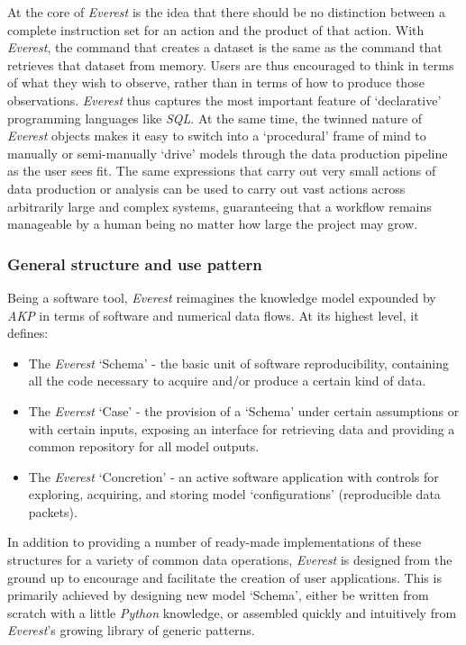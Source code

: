 \documentclass[a4paper,11pt,oneside]{book}
\begin{document}
At the core of \textit{Everest} is the idea that there should be no distinction between a complete instruction set for an action and the product of that action. With \textit{Everest}, the command that creates a dataset is the same as the command that retrieves that dataset from memory. Users are thus encouraged to think in terms of what they wish to observe, rather than in terms of how to produce those observations. \textit{Everest} thus captures the most important feature of `declarative' programming languages like \textit{SQL}. At the same time, the twinned nature of \textit{Everest} objects makes it easy to switch into a `procedural' frame of mind to manually or semi-manually `drive' models through the data production pipeline as the user sees fit. The same expressions that carry out very small actions of data production or analysis can be used to carry out vast actions across arbitrarily large and complex systems, guaranteeing that a workflow remains manageable by a human being no matter how large the project may grow.

\subsubsection{General structure and use pattern}

Being a software tool, \textit{Everest} reimagines the knowledge model expounded by \textit{AKP} in terms of software and numerical data flows. At its highest level, it defines:

\begin{itemize}
\item The \textit{Everest} `Schema' - the basic unit of software reproducibility, containing all the code necessary to acquire and/or produce a certain kind of data.
\item The \textit{Everest} `Case' - the provision of a `Schema' under certain assumptions or with certain inputs, exposing an interface for retrieving data and providing a common repository for all model outputs.
\item The \textit{Everest} `Concretion' - an active software application with controls for exploring, acquiring, and storing model `configurations' (reproducible data packets).
\end{itemize}

In addition to providing a number of ready-made implementations of these structures for a variety of common data operations, \textit{Everest} is designed from the ground up to encourage and facilitate the creation of user applications. This is primarily achieved by designing new model `Schema', either be written from scratch with a little \textit{Python} knowledge, or assembled quickly and intuitively from \textit{Everest}'s growing library of generic patterns.
\end{document}
